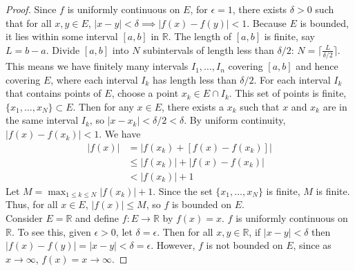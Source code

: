 \documentclass[11pt]{article}
\begin{document}
\begin{exercise}{8}
    \begin{proof}
        Since $f$ is uniformly continuous on $E$, for $\epsilon = 1$, there exists $\delta > 0$ such that for all $x, y \in E$, $|x - y| < \delta \implies |f(x) - f(y)| < 1$. Because $E$ is bounded, it lies within some interval $[a, b]$ in $\mathbb{R}$. The length of $[a, b]$ is finite, say $L = b - a$. Divide $[a, b]$ into $N$ subintervals of length less than $\delta / 2$: $N = \lceil \frac{L}{\delta / 2} \rceil$. This means we have finitely many intervals $I_1, \dots, I_n$ covering $[a, b]$ and hence covering $E$, where each interval $I_k$ has length less than $\delta / 2$. For each interval $I_k$ that contains points of $E$, choose a point $x_k \in E \cap I_k$. This set of points is finite, $\{ x_1, \dots, x_N \} \subset E$. Then for any $x \in E$, there exists a $x_k$ such that $x$ and $x_k$ are in the same interval $I_k$, so $| x- x_k| < \delta / 2 < \delta$. By uniform continuity, $|f(x) - f(x_k)| < 1$. We have \begin{equation*}
            \begin{split}
                |f(x)| & = |f(x_k) + [f(x) - f(x_k)]| \\
                & \le |f(x_k)| + |f(x) - f(x_k)| \\
                & < |f(x_k)| + 1
            \end{split}
        \end{equation*}
        Let $M = \max_{1 \le k \le N} |f(x_k)| + 1$. Since the set $\{ x_1, \dots , x_N \}$ is finite, $M$ is finite. Thus, for all $x \in E$, $|f(x)| \le M$, so $f$ is bounded on $E$. \\

        Consider $E = \mathbb{R}$ and define $f: E \to \mathbb{R}$ by $f(x) = x$. $f$ is uniformly continuous on $\mathbb{R}$. To see this, given $\epsilon > 0$, let $\delta  = \epsilon$. Then for all $x, y \in \mathbb{R}$, if $|x - y| < \delta$ then $|f(x) - f(y)| = |x - y| < \delta = \epsilon$. However, $f$ is not bounded on $E$, since as $x \to \infty$, $f(x) = x \to \infty$. 
    \end{proof}
\end{exercise}
\end{document}

